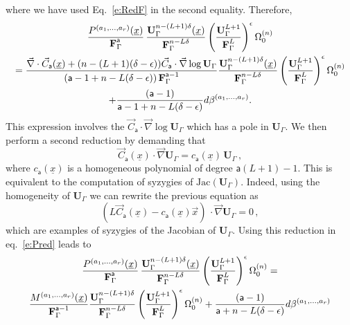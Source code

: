 \documentclass[a4paper,12pt]{article}
\numberwithin{equation}{section}
\numberwithin{figure}{section}
\begin{document}
where we have used Eq.~\eqref{e:RedF} in the second equality. Therefore, 
\begin{multline}
	\label{e:Pred}
{  P^{(a_1,\dots,a_r)}(\underline x)\over \textbf{F}_\Gamma^{\mathsf{a}}}\, { \textbf{U}_\Gamma^{n-(L+1)\delta} (\underline x)\over \textbf{F}_\Gamma^{n-L\delta}}
  \left(\textbf{U}_\Gamma^{L+1}\over \textbf{F}_\Gamma^L\right)^{\epsilon} \Omega^{(n)}_0\cr={
\vec\nabla \cdot \vec C_{\mathsf{a}}
     (\underline x)
+   (n-(L+1)(\delta-\epsilon)) \vec
    C_{\mathsf{a}}\cdot\vec\nabla\log\mathbf{U}_\Gamma\over (\mathsf{a}-1+n-L(\delta-\epsilon))\,\textbf{F}_\Gamma^{\mathsf{a}-1}}
{ \textbf{U}_\Gamma^{n-(L+1)\delta} (\underline x)\over \textbf{F}_\Gamma^{n-L\delta}}
  \left(\textbf{U}_\Gamma^{L+1}\over \textbf{F}_\Gamma^L\right)^{\epsilon} 
  \Omega_0^{(n)}\cr
+{  (\mathsf{a}-1) \over \mathsf{a}-1+n-L(\delta-\epsilon)} d\beta^{(a_1,\dots,a_r)}.
\end{multline}
%
This expression involves the $\vec
    C_{\mathsf{a}}\cdot\vec\nabla\log\mathbf{U}_\Gamma$ which has a
    pole in $\mathbf{U}_\Gamma$. We then perform a second reduction by demanding that
    \begin{equation}
      \label{e:RedU}
      \vec
    C_{\mathsf{a}}(\underline x)\cdot\vec\nabla \mathbf{U}_\Gamma =
    c_{\mathsf{a}}(\underline x) \, \mathbf{U}_\Gamma \, ,
    \end{equation}
where $ c_{\mathsf{a}}(\underline x)$ is a homogeneous polynomial of
degree $\mathsf{a}(L+1)-1$. This is equivalent to the computation of syzygies of $\text{Jac}( \mathbf U_\Gamma)$. Indeed,  using the homogeneity of $\mathbf{U}_\Gamma$ we can rewrite the previous equation as 
\begin{equation}
 \left( L   \vec
C_{\mathsf{a}}(\underline x) -
c_{\mathsf{a}}(\underline x) \vec{x} \right) \, \cdot\vec\nabla
\mathbf{U}_\Gamma =0\, ,
\end{equation}
which are examples of syzygies of the Jacobian of $\mathbf U_\Gamma$. Using this reduction in eq.~\eqref{e:Pred} leads to
% 
\begin{multline}\label{e:RedFinal}
{  P^{(a_1,\dots,a_r)}(\underline x)\over \textbf{F}_\Gamma^{\mathsf{a}}}\, { \textbf{U}_\Gamma^{n-(L+1)\delta} (\underline x)\over \textbf{F}_\Gamma^{n-L\delta}}
  \left(\textbf{U}_\Gamma^{L+1}\over \textbf{F}_\Gamma^L\right)^{\epsilon} \Omega^{(n)}_0=\cr{
M^{(a_1,\dots,a_r)}
     (\underline x)
\over \textbf{F}_\Gamma^{\mathsf{a}-1}}
{ \textbf{U}_\Gamma^{n-(L+1)\delta}\over \textbf{F}_\Gamma^{n-L\delta}}
  \left(\textbf{U}_\Gamma^{L+1}\over \textbf{F}_\Gamma^L\right)^{\epsilon} 
  \Omega_0^{(n)}
+{  (\mathsf{a}-1) \over \mathsf{a}+n-L(\delta-\epsilon)} d\beta^{(a_1,\dots,a_r)}
\end{multline}
\end{document}
